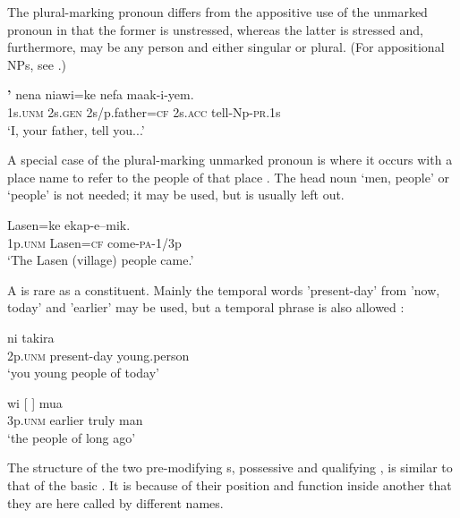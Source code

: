 The plural-marking pronoun differs from the appositive use  of the unmarked pronoun in that the former is unstressed, whereas the latter is stressed and, furthermore, may be any person and either singular or plural. (For appositional NPs, see .)

\ea%
\label{ex:4:x399}
\gll \textbf{'}  nena  niawi=ke  nefa  maak-i-yem. \\
    1s.\textsc{unm}  2s.\textsc{gen}  2s/p.father=\textsc{cf}  2s.\textsc{acc}  tell-Np-\textsc{pr}.1s  \\
\glt`I, your father, tell you...'
\z

A special case of the plural-marking unmarked pronoun is where it occurs with a place name to refer to the people of that place .  The head noun  `men, people' or   `people' is not needed; it may be used, but is usually left out.

\ea%
\label{ex:4:x400}
\gll {}  Lasen=ke  ekap-e--mik. \\
  1p.\textsc{unm}  Lasen=\textsc{cf}  come-\textsc{pa}-1/3p    \\
\glt`The Lasen (village) people came.'
\z

A  is rare as a  constituent. Mainly the temporal words   'present-day' from  'now, today'  and  'earlier'  may be used, but a temporal phrase is also allowed : 

\ea%
\label{ex:4:x401}
\gll ni    takira \\
  2p.\textsc{unm}  present-day  young.person    \\
\glt`you young people of today'
\z

\ea%
\label{ex:4:x1883}
\gll wi  [ ]  mua \\
  3p.\textsc{unm}  earlier  truly  man    \\
\glt`the people of long ago'
\z

The structure of the two pre-modifying s, possessive  and qualifying , is similar to that of the basic . It is because of their position and function inside another  that they are here called by different names.

